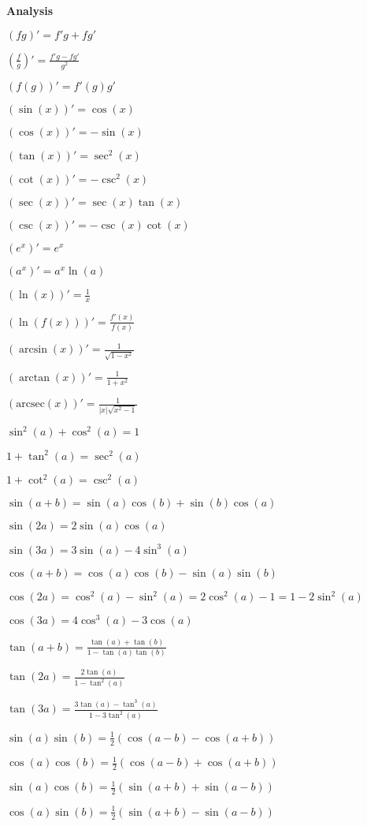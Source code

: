 \Large
\twocolumn

\textbf{Analysis}

$(fg)' = f'g+fg'$

$\left( \frac{f}{g} \right)' = \frac{f' g - f g'}{g^2}$

$(f(g))' = f'(g)g'$

$(\sin (x))' = \cos(x)$

$(\cos (x))' = -\sin(x)$

$(\tan (x))' = \sec^2 (x)$

$(\cot (x))' = -\csc^2 (x)$

$(\sec (x))' = \sec(x) \tan(x)$

$(\csc (x))' = -\csc(x) \cot(x)$

$(e^x)' = e^x$

$(a^x)' = a^x \ln(a)$

$(\ln (x))' = \frac{1}{x}$

$(\ln (f(x)))' = \frac{f'(x)}{f(x)}$

$(\arcsin (x))' = \frac{1}{\sqrt{1-x^2}}$

$(\arctan (x))' = \frac{1}{1+x^2}$

$(\text{arcsec} (x))' = \frac{1}{|x| \sqrt{x^2-1}}$

$\sin^2(a)+\cos^2(a) = 1$

$1+\tan^2(a) = \sec^2(a)$

$1+\cot^2(a) = \csc^2(a)$

$\sin(a+b) = \sin(a)\cos(b)+\sin(b)\cos(a)$

$\sin (2a) = 2\sin(a)\cos(a)$

$\sin (3a) = 3\sin(a)-4\sin^3(a)$

$\cos(a+b) = \cos(a)\cos(b)-\sin(a)\sin(b)$

$\cos (2a) = \cos^2(a)-\sin^2(a) = 2\cos^2(a)-1 = 1-2\sin^2(a)$

$\cos (3a) = 4\cos^3(a)-3\cos(a)$

$\tan (a+b) = \frac{\tan(a)+\tan(b)}{1-\tan(a)\tan(b)}$

$\tan (2a) = \frac{2\tan(a)}{1-\tan^2(a)}$

$\tan (3a) = \frac{3\tan(a)-\tan^3(a)}{1-3\tan^2(a)}$

$\sin(a) \sin(b) = \frac{1}{2} (\cos(a-b)-\cos(a+b))$

$\cos(a) \cos(b) = \frac{1}{2} (\cos(a-b)+\cos(a+b))$

$\sin(a) \cos(b) = \frac{1}{2} (\sin(a+b)+\sin(a-b))$

$\cos(a) \sin(b) = \frac{1}{2} (\sin(a+b)-\sin(a-b))$

